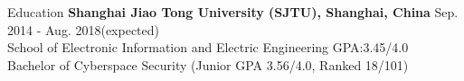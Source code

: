 \documentclass{resume} %
\begin{document}
\vspace{-1em}
\begin{rSection}{Education}
\textbf{Shanghai Jiao Tong University (SJTU), Shanghai, China} \hfill Sep. 2014 - Aug. 2018(expected)\\ %
School of Electronic Information and Electric Engineering  \hfill GPA:3.45/4.0 \\
Bachelor of Cyberspace Security \hfill (Junior GPA 3.56/4.0, Ranked 18/101)
\end{rSection}
\end{document}
